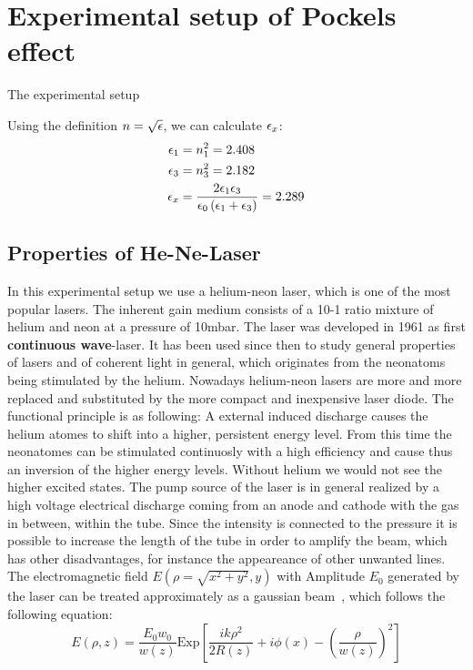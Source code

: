 \section{Experimental setup of Pockels effect}
The experimental setup



Using the definition $n = \sqrt{\epsilon}$, we can calculate $\epsilon_x$:
\begin{align}
    \epsilon_1 &= n_1^2 = 2.408 \\
    \epsilon_3 &= n_3^2 = 2.182 \\
    \epsilon_x &= \frac{2 \epsilon_1 \epsilon_3}{\epsilon_0 \left( \epsilon_1 + \epsilon_3\right)} = 2.289
\end{align}


\subsection{Properties of He-Ne-Laser}
In this experimental setup we use a helium-neon laser, which is one of the most popular lasers.
The inherent gain medium consists of a 10-1 ratio mixture of helium and neon 
at a pressure of 10mbar. The laser
was developed in 1961 as first \textbf{continuous wave}-laser. It has been used since then to
study general properties of lasers and of coherent light in general, which originates from
the neonatoms being stimulated by the helium. Nowadays helium-neon lasers are more and more
replaced and substituted by the more compact and inexpensive laser diode.
The functional principle is as following: A external induced discharge causes the helium atomes
to shift into a higher, persistent energy level. From this time the neonatomes can be stimulated
continuosly with a high efficiency and cause thus an inversion of the higher energy levels.
Without helium we would not see the higher excited states. The pump source of the laser
is in general realized by a high voltage electrical discharge coming from an anode and
cathode with the gas in between, within the tube. Since the intensity is connected to the
pressure it is possible to increase the length of the tube in order to amplify the beam, which
has other disadvantages, for instance the appeareance of other unwanted lines.
The electromagnetic field $E(\rho = \sqrt{x^2 + y^2}, y)$ with Amplitude $E_0$ 
generated by the laser can be treated approximately as a gaussian
beam~\cite{boyd2003nonlinear}, which follows the following equation:
\begin{equation}
    E(\rho,z) = \frac{E_0 w_0}{w(z)} \mathrm{Exp} \left[  
        \frac{ik\rho^2}{2R(z)} + i\phi(x) - \left( \frac{\rho}{w(z)} \right)^2    \right]
\end{equation}
